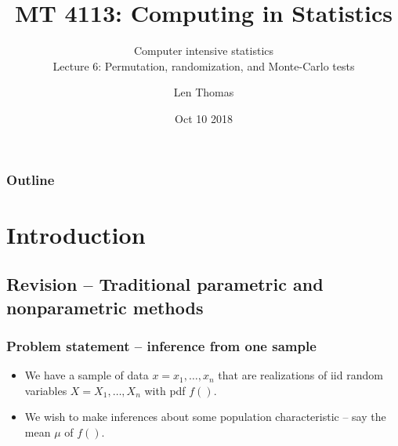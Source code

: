 \documentclass[ignorenonframetext]{beamer} %
\title[MT4113]{MT 4113: Computing in Statistics}
\subtitle{Computer intensive statistics\\Lecture 6: Permutation, randomization, and Monte-Carlo tests}
\author[Lecture 6]{Len Thomas}
\date[10/10/2018] {Oct 10  2018}
\newcommand{\bi}{\begin{itemize}}
\newcommand{\ei}{\end{itemize}}
\begin{document}
\begin{frame}
  \titlepage
\end{frame}


 {
\begin{frame}
  \frametitle{Outline}
	\tableofcontents
\end{frame}
}

\section{Introduction}

\subsection{Revision -- Traditional parametric and nonparametric methods}

\begin{frame}
	\frametitle{Problem statement -- inference from one sample}
	\bi
		\item We have a sample of data $x = x_1, \ldots, x_n$ that are realizations of iid random variables $X=X_1, \ldots, X_n$ with pdf $f()$.
		\item We wish to make inferences about some population characteristic -- say the mean $\mu$ of $f()$.
	\ei
\end{frame}
\end{document}
